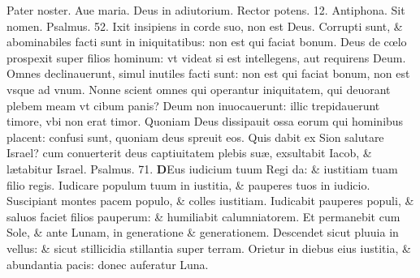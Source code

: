 \documentclass[a5paper,10pt]{book}
\def\ae{æ}
\def\oe{œ}
\begin{document}
\begin{multicols*}{2}
\par \noindent \color{red} P\color{black}ater noster. Aue maria. Deus in adiutorium. Rector potens. 12. \color{red} Antiphona. \color{black} Sit nomen. \color{red} Psalmus. 52. \color{black}
Ixit insipiens in corde suo, non est Deus.
\newline \color{red} C\color{black}orrupti sunt, \& abominabiles facti sunt in iniquitatibus: non est qui faciat bonum.
\newline \color{red} D\color{black}eus de c\oe lo prospexit super filios hominum: vt videat si est intellegens, aut requirens Deum.
\newline \color{red} O\color{black}mnes declinauerunt, simul inutiles facti sunt: non est qui faciat bonum, non est vsque ad vnum.
\newline \color{red} N\color{black}onne scient omnes qui operantur iniquitatem, qui deuorant plebem meam vt cibum panis?
\newline \color{red} D\color{black}eum non inuocauerunt: illic trepidauerunt timore, vbi non erat timor.
\newline \color{red} Q\color{black}uoniam Deus dissipauit ossa eorum qui hominibus placent: confusi sunt, quoniam deus spreuit eos.
\newline \color{red} Q\color{black}uis dabit ex Sion salutare Israel? cum conuerterit deus captiuitatem plebis su\ae , exsultabit Iacob, \& l\ae tabitur Israel. \quad \color{red} Psalmus. 71. \color{black} 
\lettrine[lines=2]{\bfseries \color{red} D}{}Eus iudicium tuum Regi da: \& iustitiam tuam filio regis.
\newline \color{red} I\color{black}udicare populum tuum in iustitia, \& pauperes tuos in iudicio.
\newline \color{red} S\color{black}uscipiant montes pacem populo, \& colles iustitiam.
\newline \color{red} I\color{black}udicabit pauperes populi, \& saluos faciet filios pauperum: \& humiliabit calumniatorem.
\newline \color{red} E\color{black}t permanebit cum Sole, \& ante Lunam, in generatione \& generationem.
\newline \color{red} D\color{black}escendet sicut pluuia in vellus: \& sicut stillicidia stillantia super terram.
\newline \color{red} O\color{black}rietur in diebus eius iustitia, \& abundantia pacis: donec auferatur Luna.

\end{multicols*}
\end{document}
